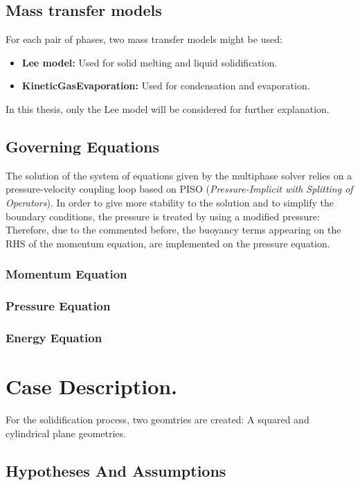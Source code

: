 \subsection{Mass transfer models}
For each pair of phases, two mass transfer models might be used:
\begin{itemize}
	\item \textbf{Lee model:} Used for solid melting and liquid solidification.
	\item \textbf{KineticGasEvaporation:} Used for condensation and evaporation.
\end{itemize}
In this thesis, only the Lee model will be considered for further explanation.




\subsection{Governing Equations}
The solution of the system of equations given by the multiphase solver relies on a pressure-velocity coupling loop based on PISO (\textit{Pressure-Implicit with Splitting of Operators}). In order to give more stability to the solution and to simplify the boundary conditions, the pressure is treated by using a modified pressure:
\newline
Therefore, due to the commented before, the buoyancy terms appearing on the RHS of the momentum equation, are implemented on the pressure equation.

\subsubsection{Momentum Equation}

\subsubsection{Pressure Equation}

\subsubsection{Energy Equation}

\section{Case Description.}
For the solidification process, two geomtries are created: A squared and cylindrical plane geometries. 

\subsection{Hypotheses And Assumptions}

